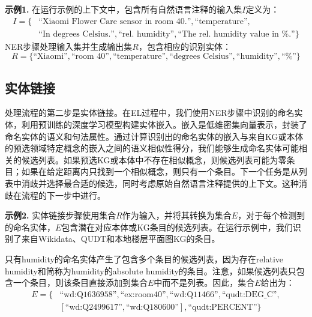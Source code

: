 \documentclass[supercite]{Experimental_Report}
\theoremstyle{definition}
\begin{document}
\textbf{示例1.} 在运行示例的上下文中，包含所有自然语言注释的输入集$I$定义为：
\begin{equation}
\begin{split}
I = \{&\text{``Xiaomi Flower Care sensor in room 40.''}, \text{``temperature''}, \\
&\text{``In degrees Celsius.''}, \text{``rel. humidity''}, \text{``The rel. humidity value in \%.''}\}
\end{split}
\end{equation}
NER步骤处理输入集并生成输出集$R$，包含相应的识别实体：
\begin{equation}
R = \{\text{``Xiaomi''}, \text{``room 40''}, \text{``temperature''}, \text{``degrees Celsius''}, \text{``humidity''}, \text{``\%''}\}
\end{equation}

\subsection{实体链接}

处理流程的第二步是实体链接。在EL过程中，我们使用NER步骤中识别的命名实体，利用预训练的深度学习模型构建实体嵌入。嵌入是低维密集向量表示，封装了命名实体的语义和句法属性\cite{ref21}。通过计算识别出的命名实体的嵌入与来自KG或本体的预选领域特定概念的嵌入之间的语义相似性得分，我们能够生成命名实体可能相关的候选列表。如果预选KG或本体中不存在相似概念，则候选列表可能为零条目；如果在给定距离内只找到一个相似概念，则只有一个条目。下一个任务是从列表中消歧并选择最合适的候选，同时考虑原始自然语言注释提供的上下文。这种消歧在流程的下一步中进行。

\textbf{示例2.} 实体链接步骤使用集合$R$作为输入，并将其转换为集合$E$，对于每个检测到的命名实体，$E$包含潜在对应本体或KG条目的候选列表。在运行示例中，我们识别了来自Wikidata\cite{ref4}、QUDT\cite{ref15}和本地楼层平面图KG\cite{ref6}的条目。

只有humidity的命名实体产生了包含多个条目的候选列表，因为存在relative humidity和简称为humidity的absolute humidity的条目。注意，如果候选列表只包含一个条目，则该条目直接添加到集合$E$中而不是列表。因此，集合$E$给出为：
\begin{equation}
\begin{split}
E = \{&\text{``wd:Q1636958''}, \text{``ex:room40''}, \text{``wd:Q11466''}, \text{``qudt:DEG\_C''}, \\
&[\text{``wd:Q2499617''}, \text{``wd:Q180600''}], \text{``qudt:PERCENT''}\}
\end{split}
\end{equation}
\end{document}
